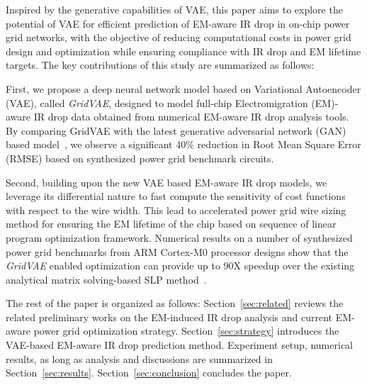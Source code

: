 
Inspired by the generative capabilities of VAE, this paper aims to explore the potential of VAE for efficient prediction of EM-aware IR drop in on-chip power grid networks, with the objective of reducing computational costs in power grid design and optimization while ensuring compliance with IR drop and EM lifetime targets. The key contributions of this study are summarized as follows:

\begin{itemlist}
\item  First, we propose a deep neural network model based on Variational Autoencoder (VAE), called {\it GridVAE}, designed to model full-chip Electromigration (EM)-aware IR drop data obtained from numerical EM-aware IR drop analysis tools. By comparing GridVAE with the latest generative adversarial network (GAN) based model~\cite{ZhouJin:ICCAD'20}, we observe a significant 40\% reduction in Root Mean Square Error (RMSE) based on synthesized power grid benchmark circuits.

\item Second, building upon the new VAE based EM-aware IR drop models, we leverage its differential nature to fast compute the sensitivity of cost functions with respect to the wire width. This lead to accelerated power grid wire sizing method for ensuring the EM lifetime of the chip based on sequence of linear program optimization framework. Numerical results on a number of synthesized power grid benchmarks from ARM Cortex-M0 processor designs show that the {\it GridVAE} enabled optimization can provide up to $90$X speedup over the existing analytical matrix solving-based SLP method~\cite{Sukharev:2019pg}.
 
\end{itemlist}

The rest of the paper is organized as follows: Section~\ref{sec:related} reviews the related preliminary works on the EM-induced IR drop analysis and current EM-aware power grid optimization strategy. Section~\ref{sec:strategy} introduces the VAE-based EM-aware IR drop prediction method. Experiment setup, numerical results, as long as analysis and discussions are summarized in Section~\ref{sec:results}.  Section~\ref{sec:conclusion} concludes the paper.
